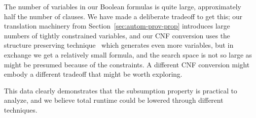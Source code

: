 The number of variables in our Boolean formulas is quite large,
approximately half the number of clauses.  We have made a deliberate
tradeoff to get this; our translation machinery from
Section~\ref{sec:autom-prov-prop} introduces large numbers of tightly
constrained variables, and our CNF conversion uses the structure
preserving technique~\cite{plaisted86structure} which generates even
more variables, but in exchange we get a relatively small formula, and
the search space is not so large as might be presumed because of the
constraints.  A different CNF conversion might embody a different
tradeoff that might be worth exploring.

This data clearly demonstrates that the subsumption property is
practical to analyze, and we believe total runtime could be lowered
through different techniques.


